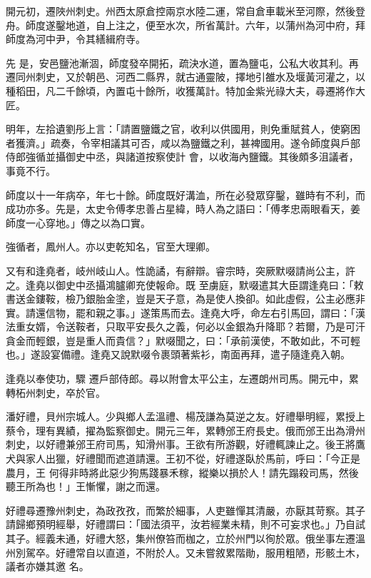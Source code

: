 \begin{pinyinscope}
 開元初，遷陜州刺史。州西太原倉控兩京水陸二運，常自倉車載米至河際，然後登舟。師度遂鑿地道，自上注之，便至水次，所省萬計。六年，以蒲州為河中府，拜師度為河中尹，令其繕緝府寺。



 先
 是，安邑鹽池漸涸，師度發卒開拓，疏決水道，置為鹽屯，公私大收其利。再遷同州刺史，又於朝邑、河西二縣界，就古通靈陂，擇地引雒水及堰黃河灌之，以種稻田，凡二千餘頃，內置屯十餘所，收獲萬計。特加金紫光祿大夫，尋遷將作大匠。



 明年，左拾遺劉彤上言：「請置鹽鐵之官，收利以供國用，則免重賦貧人，使窮困者獲濟。」疏奏，令宰相議其可否，咸以為鹽鐵之利，甚裨國用。遂令師度與戶部侍郎強循並攝御史中丞，與諸道按察使計
 會，以收海內鹽鐵。其後頗多沮議者，事竟不行。



 師度以十一年病卒，年七十餘。師度既好溝洫，所在必發眾穿鑿，雖時有不利，而成功亦多。先是，太史令傅孝忠善占星緯，時人為之語曰：「傅孝忠兩眼看天，姜師度一心穿地。」傳之以為口實。



 強循者，鳳州人。亦以吏乾知名，官至大理卿。



 又有和逢堯者，岐州岐山人。性詭譎，有辭辯。睿宗時，突厥默啜請尚公主，許之。逢堯以御史中丞攝鴻臚卿充使報命。既
 至虜庭，默啜遣其大臣謂逢堯曰：「敕書送金鏤鞍，檢乃銀胎金塗，豈是天子意，為是使人換卻。如此虛假，公主必應非實。請還信物，罷和親之事。」遂策馬而去。逢堯大呼，命左右引馬回，謂曰：「漢法重女婿，令送鞍者，只取平安長久之義，何必以金銀為升降耶？若爾，乃是可汗貪金而輕銀，豈是重人而貴信？」默啜聞之，曰：「承前漢使，不敢如此，不可輕也。」遂設宴備禮。逢堯又說默啜令裹頭著紫衫，南面再拜，遣子隨逢堯入朝。



 逢堯以奉使功，驟
 遷戶部侍郎。尋以附會太平公主，左遷朗州司馬。開元中，累轉柘州刺史，卒於官。



 潘好禮，貝州宗城人。少與鄉人孟溫禮、楊茂謙為莫逆之友。好禮舉明經，累授上蔡令，理有異績，擢為監察御史。開元三年，累轉邠王府長史。俄而邠王出為滑州刺史，以好禮兼邠王府司馬，知滑州事。王欲有所游觀，好禮輒諫止之。後王將鷹犬與家人出獵，好禮聞而遮道請還。王初不從，好禮遂臥於馬前，呼曰：「今正是農月，王
 何得非時將此惡少狗馬踐暴禾稼，縱樂以損於人！請先蹋殺司馬，然後聽王所為也！」王慚懼，謝之而還。



 好禮尋遷豫州刺史，為政孜孜，而繁於細事，人吏雖憚其清嚴，亦厭其苛察。其子請歸鄉預明經舉，好禮謂曰：「國法須平，汝若經業未精，則不可妄求也。」乃自試其子。經義未通，好禮大怒，集州僚笞而枷之，立於州門以徇於眾。俄坐事左遷溫州別駕卒。好禮常自以直道，不附於人。又未嘗敘累階勛，服用粗陋，形骸土木，議者亦嫌其邀
 名。




\end{pinyinscope}
